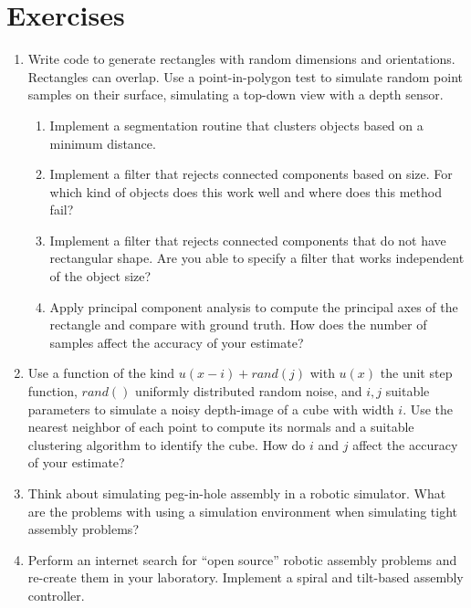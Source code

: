 \section*{Exercises}
\begin{enumerate}
\item Write code to generate rectangles with random dimensions and orientations. Rectangles can overlap. Use a point-in-polygon test to simulate random point samples on their surface, simulating a top-down view with a depth sensor.
\begin{enumerate}
\item Implement a segmentation routine that clusters objects based on a minimum distance.
\item Implement a filter that rejects connected components based on size. For which kind of objects does this work well and where does this method fail?
\item Implement a filter that rejects connected components that do not have rectangular shape. Are you able to specify a filter that works independent of the object size?
\item Apply principal component analysis to compute the principal axes of the rectangle and compare with ground truth. How does the number of samples affect the accuracy of your estimate?
\end{enumerate}
\item Use a function of the kind $u(x-i)+rand(j)$ with $u(x)$ the unit step function, $rand()$ uniformly distributed random noise, and $i,j$ suitable parameters to simulate a noisy depth-image of a cube with width $i$. Use the nearest neighbor of each point to compute its normals and a suitable clustering algorithm to identify the cube. How do $i$ and $j$ affect the accuracy of your estimate?
\item Think about simulating peg-in-hole assembly in a robotic simulator. What are the problems with using a simulation environment when simulating tight assembly problems?
\item Perform an internet search for ``open source'' robotic assembly problems and re-create them in your laboratory. Implement a spiral and tilt-based assembly controller. 
\end{enumerate}
